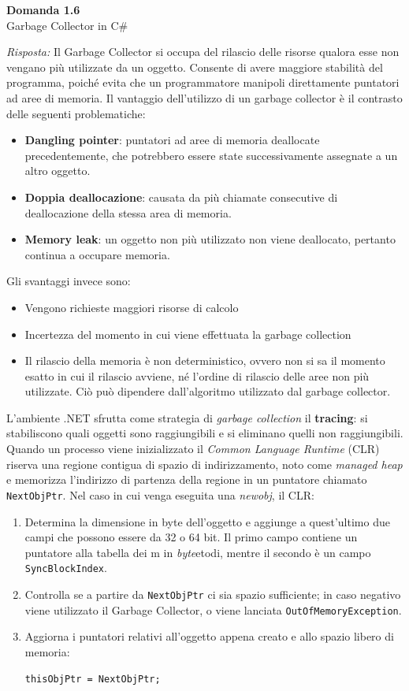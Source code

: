 \documentclass{article}
\newenvironment{problem}[2][Domanda]
    { \begin{mdframed}[backgroundcolor=gray!20] \textbf{#1 #2} \\}
    {  \end{mdframed}}
\newenvironment{solution}
    {\textit{Risposta:}}
    {}
\begin{document}
\begin{problem}{1.6}
Garbage Collector in C\#
\end{problem}
\begin{solution}
Il Garbage Collector si occupa del rilascio delle risorse qualora esse non vengano più utilizzate da un oggetto.
Consente di avere maggiore stabilità del programma, poiché evita che un programmatore manipoli direttamente puntatori ad aree di memoria.
\newline
Il vantaggio dell'utilizzo di un garbage collector è il contrasto delle seguenti problematiche:
\begin{itemize}
	\item \textbf{Dangling pointer}: puntatori ad aree di memoria deallocate precedentemente, che potrebbero essere state successivamente assegnate a un altro oggetto.
	\item \textbf{Doppia deallocazione}: causata da più chiamate consecutive di deallocazione della stessa area di memoria.
	\item \textbf{Memory leak}: un oggetto non più utilizzato non viene deallocato, pertanto continua a occupare memoria.
\end{itemize}
Gli svantaggi invece sono:
\begin{itemize}
	\item Vengono richieste maggiori risorse di calcolo
	\item Incertezza del momento in cui viene effettuata la garbage collection
	\item Il rilascio della memoria è non deterministico, ovvero non si sa il momento esatto in cui il rilascio avviene, né l'ordine di rilascio delle aree non più utilizzate. Ciò può dipendere dall'algoritmo utilizzato dal garbage collector.
\end{itemize}
L'ambiente .NET sfrutta come strategia di \textit{garbage collection} il \textbf{tracing}: si stabiliscono quali oggetti sono raggiungibili e si eliminano quelli non raggiungibili.\newline
Quando un processo viene inizializzato il \textit{Common Language Runtime} (CLR) riserva una regione contigua di spazio di indirizzamento, noto come \textit{managed heap} e memorizza l'indirizzo di partenza della regione in un puntatore chiamato \texttt{NextObjPtr}.
Nel caso in cui venga eseguita una \textit{newobj}, il CLR:
\begin{enumerate}
	\item Determina la dimensione in byte dell'oggetto e aggiunge a quest'ultimo due campi che possono essere da 32 o 64 bit.
	Il primo campo contiene un puntatore alla tabella dei m in \textit{byte}etodi, mentre il secondo è un campo \texttt{SyncBlockIndex}.
	\item Controlla se a partire da \texttt{NextObjPtr} ci sia spazio sufficiente; in caso negativo viene utilizzato il Garbage Collector, o viene lanciata \texttt{OutOfMemoryException}.
	\item Aggiorna i puntatori relativi all'oggetto appena creato e allo spazio libero di memoria:
	\begin{center}
		\texttt{thisObjPtr = NextObjPtr;}


\end{center}
\end{enumerate}
\end{solution}
\end{document}
